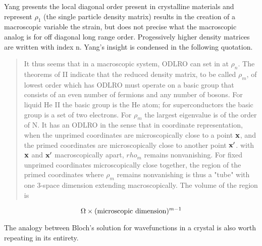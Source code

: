 \documentclass{article}
\def\x{{\bf x}}
\begin{document}
Yang presents the local diagonal order present in crystalline materials
and represent $\rho_{1}$ (the single particle density matrix) results in the 
creation of a macroscopic variable the strain, but does not precise what the macroscopic 
analog is for off diagonal long range order. Progessively higher density matrices are 
written with index n. Yang's insight is condensed in the following quotation.
%
\begin{quote}
It thus seems that in a macroscopic system, ODLRO can set in 
at $\rho_{n}$. The theorems of II indicate that
the reduced density matrix, to be called $\rho_{m}$, of lowest
order which has ODLRO must operate on a basic group that consists 
of an even number of fermions and any number of bosons. For liquid He II the basic
group is the He atom; for superconductors the basic group is a set of two electrons.
For $\rho_{m}$ the largest eigenvalue is of the order of N. It has an ODLRO
in the sense that in coordinate representation, when the unprimed coordinates are
microscopically close to a point $\x$, and the primed coordinates are microscopically
close to another point $\x'$. with $\x$ and $\x'$ macroscopically apart, $rho_{m}$
remains nonvanishing. For fixed unprimed coordinates microscopically
close together, the region of the primed coordinates where
$\rho_{m}$ remains nonvanishing is thus a "tube" with one 3-space dimension 
extending macroscopically. The volume of the region is 
\end{quote}
\begin{equation}
\Omega \times ({\rm microscopic\ dimension})^{m-1}
\end{equation}
%

The analogy between Bloch's solution for wavefunctions in a crystal is also worth
repeating in its entirety.
\end{document}
